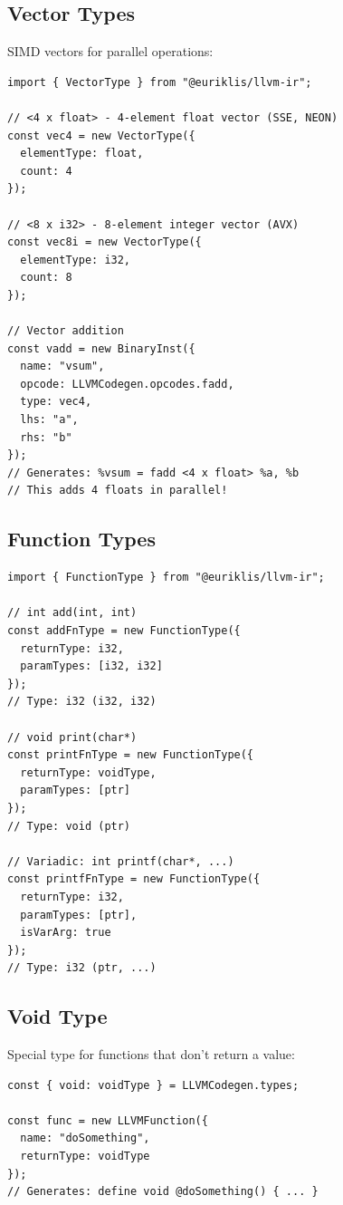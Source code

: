 \documentclass[11pt]{article}
\begin{document}
\subsection{Vector Types}

SIMD vectors for parallel operations:

\begin{lstlisting}[style=ts]
import { VectorType } from "@euriklis/llvm-ir";

// <4 x float> - 4-element float vector (SSE, NEON)
const vec4 = new VectorType({
  elementType: float,
  count: 4
});

// <8 x i32> - 8-element integer vector (AVX)
const vec8i = new VectorType({
  elementType: i32,
  count: 8
});

// Vector addition
const vadd = new BinaryInst({
  name: "vsum",
  opcode: LLVMCodegen.opcodes.fadd,
  type: vec4,
  lhs: "a",
  rhs: "b"
});
// Generates: %vsum = fadd <4 x float> %a, %b
// This adds 4 floats in parallel!
\end{lstlisting}

\subsection{Function Types}

\begin{lstlisting}[style=ts]
import { FunctionType } from "@euriklis/llvm-ir";

// int add(int, int)
const addFnType = new FunctionType({
  returnType: i32,
  paramTypes: [i32, i32]
});
// Type: i32 (i32, i32)

// void print(char*)
const printFnType = new FunctionType({
  returnType: voidType,
  paramTypes: [ptr]
});
// Type: void (ptr)

// Variadic: int printf(char*, ...)
const printfFnType = new FunctionType({
  returnType: i32,
  paramTypes: [ptr],
  isVarArg: true
});
// Type: i32 (ptr, ...)
\end{lstlisting}

\subsection{Void Type}

Special type for functions that don't return a value:

\begin{lstlisting}[style=ts]
const { void: voidType } = LLVMCodegen.types;

const func = new LLVMFunction({
  name: "doSomething",
  returnType: voidType
});
// Generates: define void @doSomething() { ... }
\end{lstlisting}
\end{document}
